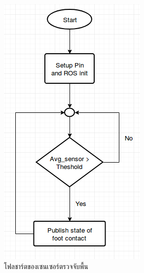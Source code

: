 \begin{figure}[!ht]
    \centering
    \begin{subfigure}[b]{0.40\textwidth}
        \centering
        \includegraphics[width=\textwidth]{chapter3/images/gcs_flowchart.png}
        \caption{โฟลชาร์ตของเซนเซอร์ตรวจจับพื้น}
    \end{subfigure}
    \hfill
    \begin{subfigure}[b]{0.50\textwidth}

\end{subfigure}
\end{figure}
